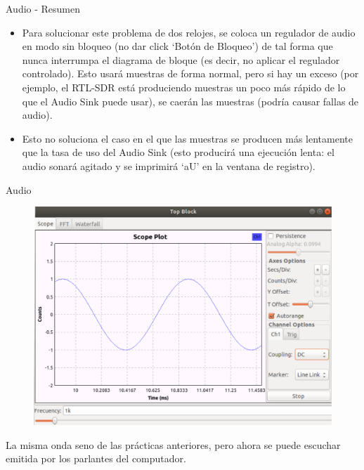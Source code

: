 \begin{frame}{Audio - Resumen}
\begin{itemize}
    \item 
    {Para solucionar este problema de dos relojes, se coloca un regulador de audio en modo sin bloqueo (no dar click ‘Botón de Bloqueo’) de tal forma que nunca interrumpa el diagrama de bloque (es decir, no aplicar el regulador controlado). Esto usará muestras de forma normal, pero si hay un exceso (por ejemplo, el RTL-SDR está produciendo muestras un poco más rápido de lo que el Audio Sink puede usar), se caerán las muestras (podría causar fallas de audio).}
    \item 
    {Esto no soluciona el caso en el que las muestras se producen más lentamente que la tasa de uso del Audio Sink (esto producirá una ejecución lenta: el audio sonará agitado y se imprimirá ‘aU’ en la ventana de registro).}
\end{itemize}



\end{frame}

\begin{frame}{Audio}

\begin{figure}

\begin{center}
\vspace{-7mm}
\includegraphics[width=\textwidth, height=0.6\paperheight]{lab3/pdf/lab3_5.pdf}
\end{center}
\end{figure}
\vspace{-4mm}
La misma onda seno de las prácticas anteriores, pero ahora se puede escuchar emitida por los parlantes del computador.
\end{frame}

